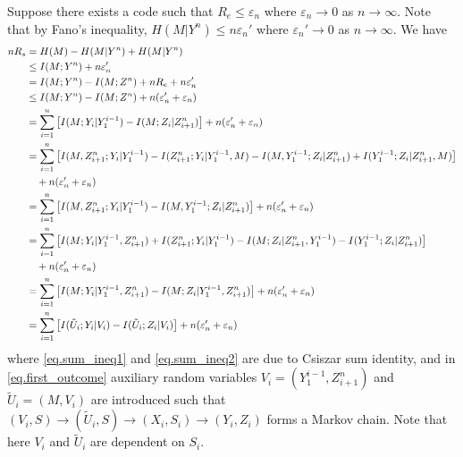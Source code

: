 \documentclass[12pt, Draft, onecolumn]{IEEEtran}
\begin{document}
Suppose there exists a code such that $R_e\leq \varepsilon_n$ where $\varepsilon_n\rightarrow 0$ as $n\rightarrow \infty$. Note that by Fano's inequality, $H(M|Y^n)\leq n\varepsilon_n'$ where $\varepsilon_n'\rightarrow 0$ as $n\rightarrow \infty$. We have
\begin{align}
nR_s &= H(M)-H(M|Y^n) +H(M|Y^n)\notag\\
&\leq I(M;Y^n) + n\varepsilon_n'\notag\\
&= I(M;Y^n)-I(M;Z^n) +nR_e+n\varepsilon_n'\notag\\
&\leq  I(M;Y^n)-I(M;Z^n) +n(\varepsilon_n'+\varepsilon_n)\notag\\
&= \sum_{i=1}^n \left[I(M;Y_i|Y_1^{i-1})-I(M;Z_i|Z_{i+1}^n)\right]+n(\varepsilon_n'+\varepsilon_n)\notag\\
&= \sum_{i=1}^n \left[I(M,Z_{i+1}^n;Y_i|Y_1^{i-1})-I(Z_{i+1}^n;Y_i|Y_1^{i-1},M)-I(M,Y_1^{i-1};Z_i|Z_{i+1}^n)+I(Y_1^{i-1};Z_i|Z_{i+1}^n,M)\right]\notag\\
&\quad+n(\varepsilon_n'+\varepsilon_n)\notag\\
\label{eq.sum_ineq1}
&= \sum_{i=1}^n \left[I(M,Z_{i+1}^n;Y_i|Y_1^{i-1})-I(M,Y_1^{i-1};Z_i|Z_{i+1}^n)\right]+n(\varepsilon_n'+\varepsilon_n)\\
&= \sum_{i=1}^n \left[I(M;Y_i|Y_1^{i-1},Z_{i+1}^n)+I(Z_{i+1}^n;Y_i|Y_1^{i-1})-I(M;Z_i|Z_{i+1}^n,Y_1^{i-1})-I(Y_1^{i-1};Z_i|Z_{i+1}^n)\right]\notag\\
&\quad+n(\varepsilon_n'+\varepsilon_n)\notag\\
\label{eq.sum_ineq2}
&= \sum_{i=1}^n \left[I(M;Y_i|Y_1^{i-1},Z_{i+1}^n)-I(M;Z_i|Y_1^{i-1},Z_{i+1}^n)\right]+n(\varepsilon_n'+\varepsilon_n)\\
\label{eq.first_outcome}
&= \sum_{i=1}^n \left[I(\tilde{U}_i;Y_i|V_i)-I(\tilde{U}_i;Z_i|V_i)\right]+n(\varepsilon_n'+\varepsilon_n)
\end{align}
where \eqref{eq.sum_ineq1} and \eqref{eq.sum_ineq2} are due to Csiszar sum identity, and in \eqref{eq.first_outcome} auxiliary random variables $V_i = (Y_1^{i-1},Z_{i+1}^n)$ and $\tilde{U}_i = (M,V_i)$ are introduced such that $(V_i,S)\rightarrow (\tilde{U}_i,S)\rightarrow (X_i,S_i)  \rightarrow (Y_i,Z_i)$ forms a Markov chain. Note that here $V_i$ and $\tilde{U}_i$ are dependent on $S_i$.

\end{document}
